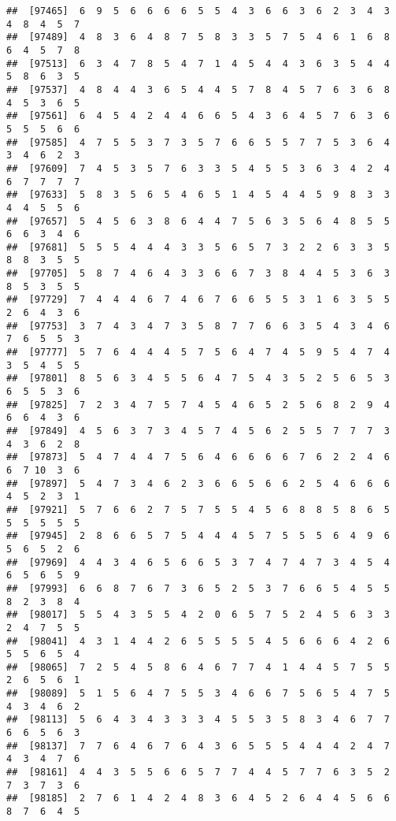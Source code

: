 \documentclass[
]{book}
\begin{document}
\begin{verbatim}
##  [97465]  6  9  5  6  6  6  6  5  5  4  3  6  6  3  6  2  3  4  3  4  8  4  5  7
##  [97489]  4  8  3  6  4  8  7  5  8  3  3  5  7  5  4  6  1  6  8  6  4  5  7  8
##  [97513]  6  3  4  7  8  5  4  7  1  4  5  4  4  3  6  3  5  4  4  5  8  6  3  5
##  [97537]  4  8  4  4  3  6  5  4  4  5  7  8  4  5  7  6  3  6  8  4  5  3  6  5
##  [97561]  6  4  5  4  2  4  4  6  6  5  4  3  6  4  5  7  6  3  6  5  5  5  6  6
##  [97585]  4  7  5  5  3  7  3  5  7  6  6  5  5  7  7  5  3  6  4  3  4  6  2  3
##  [97609]  7  4  5  3  5  7  6  3  3  5  4  5  5  3  6  3  4  2  4  6  7  7  7  7
##  [97633]  5  8  3  5  6  5  4  6  5  1  4  5  4  4  5  9  8  3  3  4  4  5  5  6
##  [97657]  5  4  5  6  3  8  6  4  4  7  5  6  3  5  6  4  8  5  5  6  6  3  4  6
##  [97681]  5  5  5  4  4  4  3  3  5  6  5  7  3  2  2  6  3  3  5  8  8  3  5  5
##  [97705]  5  8  7  4  6  4  3  3  6  6  7  3  8  4  4  5  3  6  3  8  5  3  5  5
##  [97729]  7  4  4  4  6  7  4  6  7  6  6  5  5  3  1  6  3  5  5  2  6  4  3  6
##  [97753]  3  7  4  3  4  7  3  5  8  7  7  6  6  3  5  4  3  4  6  7  6  5  5  3
##  [97777]  5  7  6  4  4  4  5  7  5  6  4  7  4  5  9  5  4  7  4  3  5  4  5  5
##  [97801]  8  5  6  3  4  5  5  6  4  7  5  4  3  5  2  5  6  5  3  6  5  5  3  6
##  [97825]  7  2  3  4  7  5  7  4  5  4  6  5  2  5  6  8  2  9  4  6  6  4  3  6
##  [97849]  4  5  6  3  7  3  4  5  7  4  5  6  2  5  5  7  7  7  3  4  3  6  2  8
##  [97873]  5  4  7  4  4  7  5  6  4  6  6  6  6  7  6  2  2  4  6  6  7 10  3  6
##  [97897]  5  4  7  3  4  6  2  3  6  6  5  6  6  2  5  4  6  6  6  4  5  2  3  1
##  [97921]  5  7  6  6  2  7  5  7  5  5  4  5  6  8  8  5  8  6  5  5  5  5  5  5
##  [97945]  2  8  6  6  5  7  5  4  4  4  5  7  5  5  5  6  4  9  6  5  6  5  2  6
##  [97969]  4  4  3  4  6  5  6  6  5  3  7  4  7  4  7  3  4  5  4  6  5  6  5  9
##  [97993]  6  6  8  7  6  7  3  6  5  2  5  3  7  6  6  5  4  5  5  8  2  3  8  4
##  [98017]  5  5  4  3  5  5  4  2  0  6  5  7  5  2  4  5  6  3  3  2  4  7  5  5
##  [98041]  4  3  1  4  4  2  6  5  5  5  5  4  5  6  6  6  4  2  6  5  5  6  5  4
##  [98065]  7  2  5  4  5  8  6  4  6  7  7  4  1  4  4  5  7  5  5  2  6  5  6  1
##  [98089]  5  1  5  6  4  7  5  5  3  4  6  6  7  5  6  5  4  7  5  4  3  4  6  2
##  [98113]  5  6  4  3  4  3  3  3  4  5  5  3  5  8  3  4  6  7  7  6  6  5  6  3
##  [98137]  7  7  6  4  6  7  6  4  3  6  5  5  5  4  4  4  2  4  7  4  3  4  7  6
##  [98161]  4  4  3  5  5  6  6  5  7  7  4  4  5  7  7  6  3  5  2  7  3  7  3  6
##  [98185]  2  7  6  1  4  2  4  8  3  6  4  5  2  6  4  4  5  6  6  8  7  6  4  5

\end{verbatim}
\end{document}
